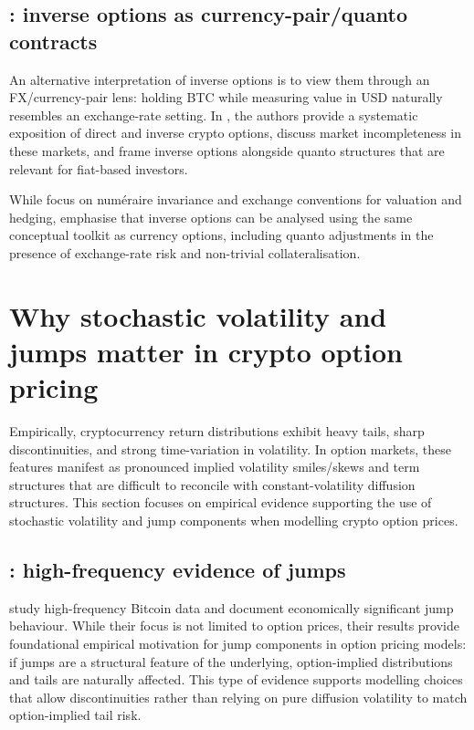 \documentclass[a4paper,titlepage,12pt]{report}
\theoremstyle{plain}
\begin{document}
\subsection{\citet{AlexanderChenImeraj2023}: inverse options as currency-pair/quanto contracts}\label{subsec:alexander_quanto}

An alternative interpretation of inverse options is to view them through an FX/currency-pair lens:
holding BTC while measuring value in USD naturally resembles an exchange-rate setting. In
\citet{AlexanderChenImeraj2023}, the authors provide a systematic exposition of direct and inverse
crypto options, discuss market incompleteness in these markets, and frame inverse options alongside
quanto structures that are relevant for fiat-based investors.

While \citet{LucicSepp2024} focus on num\'eraire invariance and exchange conventions for valuation and hedging, \citet{AlexanderChenImeraj2023} emphasise that inverse options can be analysed using the same conceptual toolkit as currency options, including quanto adjustments in the presence of exchange-rate risk and non-trivial collateralisation.

\section{Why stochastic volatility and jumps matter in crypto option pricing}\label{sec:svj_empirical}

Empirically, cryptocurrency return distributions exhibit heavy tails, sharp discontinuities, and
strong time-variation in volatility. In option markets, these features manifest as pronounced implied
volatility smiles/skews and term structures that are difficult to reconcile with constant-volatility diffusion structures. This section focuses on empirical evidence supporting the use of stochastic volatility and jump components when modelling crypto option prices.

\subsection{\citet{ScailletTreccaniTrevisan2020}: high-frequency evidence of jumps}\label{subsec:scaillet_jumps}

\citet{ScailletTreccaniTrevisan2020} study high-frequency Bitcoin data and document economically
significant jump behaviour. While their focus is not limited to option prices, their results provide
foundational empirical motivation for jump components in option pricing models: if jumps are a structural feature of the underlying, option-implied distributions and tails are naturally affected. This type of evidence supports modelling choices that allow discontinuities rather than relying on
pure diffusion volatility to match option-implied tail risk.
\end{document}
